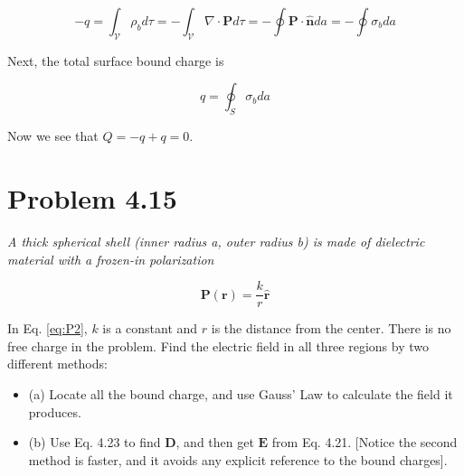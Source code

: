 \documentclass[10pt]{article}
\begin{document}
\begin{equation}
-q = \int_{\mathcal{V}} \rho_b d\tau = -\int_{\mathcal{V}} \nabla \cdot \mathbf{P} d\tau = -\oint \mathbf{P} \cdot \hat{\mathbf{n}} da = -\oint \sigma_b da
\end{equation}

Next, the total surface bound charge is

\begin{equation}
q = \oint_S \sigma_b da
\end{equation}

Now we see that $Q = -q + q = 0$.

\section{Problem 4.15}

\textit{A thick spherical shell (inner radius a, outer radius b) is made of dielectric material with a frozen-in polarization}

\begin{equation}
\mathbf{P}(\mathbf{r}) = \frac{k}{r}\hat{\mathbf{r}} \label{eq:P2}
\end{equation}

In Eq. \ref{eq:P2}, $k$ is a constant and $r$ is the distance from the center.  There is no free charge in the problem.  Find the electric field in all three regions by two different methods:
\begin{itemize}
\item (a) Locate all the bound charge, and use Gauss' Law to calculate the field it produces.
\item (b) Use Eq. 4.23 to find $\mathbf{D}$, and then get $\mathbf{E}$ from Eq. 4.21. [Notice the second method is faster, and it avoids any explicit reference to the bound charges].
\end{itemize}
\end{document}
